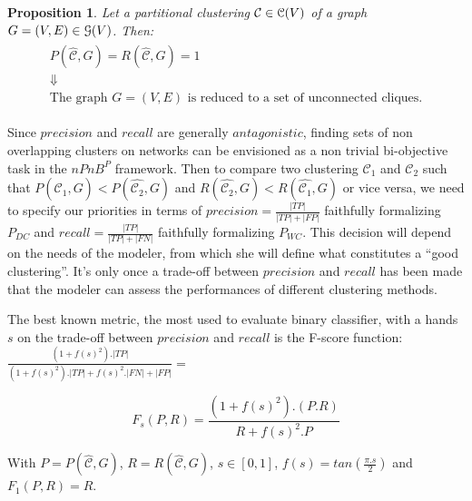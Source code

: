 \documentclass[12pt]{article}
\theoremstyle{thmstyleone}%
\newtheorem{proposition}[theorem]{Proposition}%
\theoremstyle{definition}
\begin{document}
\begin{proposition}
Let a partitional clustering $\mathcal{C} \in \EuScript{C}(V)$ of a graph $G=(V,E)\in \EuScript{G}(V)$.
Then:
\begin{gather*}
\begin{array}{c}
  P(\widehat{\mathcal{C}},G) = R(\widehat{\mathcal{C}},G) = 1\\
  \Downarrow \\
  \text{The graph } G=(V,E) \text{ is reduced to a set of unconnected cliques.}
\end{array}
\end{gather*}
\end{proposition}

Since $precision$ and $recall$ are generally $antagonistic$, finding sets of non overlapping clusters on networks can be envisioned as a non trivial bi-objective task in the $nPnB^P$ framework.
%
Then to compare two clustering $\mathcal{C}_{1}$ and $\mathcal{C}_{2}$ such that $P(\widehat{\mathcal{C}_{1}},G) < P(\widehat{\mathcal{C}_{2}},G)$ and
$R(\widehat{\mathcal{C}_{2}},G) < R(\widehat{\mathcal{C}_{1}},G)$ or vice versa,
we need to specify our priorities in terms of $precision=\frac{|TP|}{|TP| + |FP|}$ faithfully formalizing $P_{DC}$ and $recall=\frac{|TP|}{|TP| + |FN|}$ faithfully formalizing $P_{WC}$.
This decision will depend on the needs of the modeler, from which she will define what constitutes a “good clustering”. It's only once a trade-off between $precision$ and $recall$ has been made that the modeler can assess the performances of different clustering methods.

The best known metric, the most used to evaluate binary classifier, with a hands $s$ on the trade-off between $precision$ and $recall$ is the F-score function:
$\frac{(1 + f(s)^2).|TP|}{(1 + f(s)^2).|TP| + f(s)^2.|FN| + |FP|}=$

\begin{equation}\label{FsPR}
    F_s(P,R)=\frac{(1+f(s)^2).(P.R)}{R+f(s)^2.P}
\end{equation}

\hspace{1.5cm} With $P=P(\widehat{\mathcal{C}},G)$, $R=R(\widehat{\mathcal{C}},G)$, $s\in[0,1]$, $f(s)=tan(\frac{\pi.s}{2})$ and $F_{1}(P,R) = R$.
\end{document}
